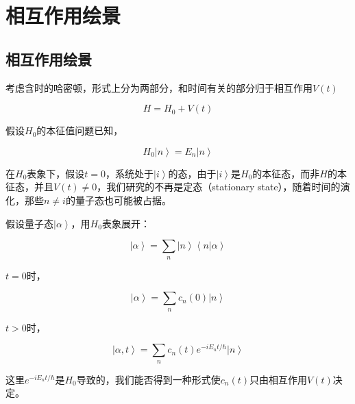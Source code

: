 \section{相互作用绘景}

\subsection{相互作用绘景}

考虑含时的哈密顿，形式上分为两部分，和时间有关的部分归于相互作用$V(t)$

\begin{equation}
H = H_0 + V(t)
\end{equation}

假设$H_0$的本征值问题已知，

\begin{equation}
H_0 \left| n \right\rangle = E_n \left| n \right\rangle
\end{equation}

在$H_0$表象下，假设$t = 0$，系统处于$\left| i \right\rangle$的态，由于$\left| i \right\rangle$是$H_0$的本征态，而非$H$的本征态，并且$V(t) \neq 0$，我们研究的不再是定态（stationary state），随着时间的演化，那些$n \neq i$的量子态也可能被占据。

假设量子态$\left| \alpha \right\rangle$，用$H_0$表象展开：

\begin{equation}
\left| \alpha \right\rangle = \sum\limits_n  \left| n \right\rangle \left\langle n | \alpha \right\rangle
\end{equation}

$t = 0$时，

\begin{equation}
\left| \alpha \right\rangle = \sum\limits_n c_n(0) \left| n \right\rangle
\end{equation}

$t > 0$时，

\begin{equation}
\left| \alpha, t \right\rangle = \sum\limits_n c_n(t) e^{- i E_n t / \hbar} \left| n \right\rangle
\end{equation}

这里$e^{- i E_n t / \hbar}$是$H_0$导致的，我们能否得到一种形式使$c_n (t)$只由相互作用$V(t)$决定。


